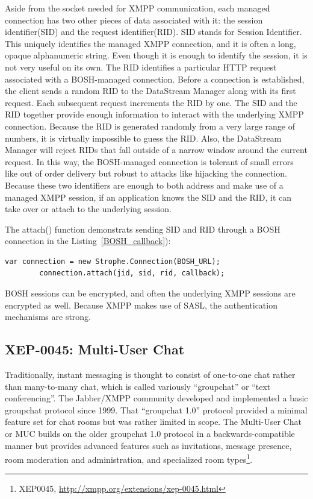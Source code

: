 Aside from the socket needed for XMPP communication, each managed connection has two other pieces of data associated with it: the session identifier(SID) and the request identifier(RID). SID stands for Session Identifier. This uniquely identifies the managed XMPP connection, and it is often a long, opaque alphanumeric string. Even though it is enough to identify the session, it is not very useful on its own. The RID identifies a particular HTTP request associated with a BOSH-managed connection. Before a connection is established, the client sends a random RID to the DataStream Manager along with its first request. Each subsequent request increments the RID by one. The SID and the RID together provide enough information to interact with the underlying XMPP connection. Because the RID is generated randomly from a very large range of numbers, it is virtually impossible to guess the RID. Also, the DataStream Manager will reject RIDs that fall outside of a narrow window around the current request. In this way, the BOSH-managed connection is tolerant of small errors like out of order delivery but robust to attacks like hijacking the connection. Because these two identifiers are enough to both address and make use of a managed XMPP session, if an application knows the SID and the RID, it can take over or attach to the underlying session.

The attach() function demonstrats sending SID and RID through a BOSH connection in the Listing~\ref{BOSH_callback}):
	    \begin{lstlisting}[label=BOSH_callback,caption=BOSH Callback]
		var connection = new Strophe.Connection(BOSH_URL);
        connection.attach(jid, sid, rid, callback);
	    \end{lstlisting}

BOSH sessions can be encrypted, and often the underlying XMPP sessions are encrypted as well. Because XMPP makes use of SASL, the authentication mechanisms are strong.

\subsection{XEP-0045: Multi-User Chat}
Traditionally, instant messaging is thought to consist of one-to-one chat rather than many-to-many chat, which is called variously ``groupchat'' or ``text conferencing''. The Jabber/XMPP community developed and implemented a basic groupchat protocol since 1999. That ``groupchat 1.0'' protocol provided a minimal feature set for chat rooms but was rather limited in scope. The Multi-User Chat or MUC builds on the older groupchat 1.0 protocol in a backwards-compatible manner but provides advanced features such as invitations, message presence, room moderation and administration, and specialized room types\footnote{XEP0045, \url{http://xmpp.org/extensions/xep-0045.html}}.

